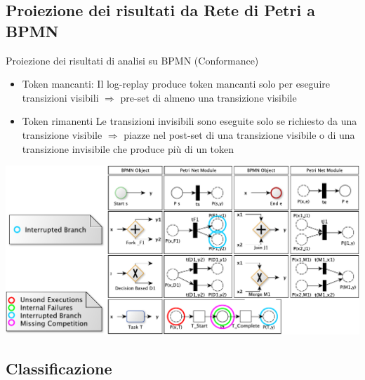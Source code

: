 \documentclass[10pt]{beamer}
\begin{document}
	\subsection{Proiezione dei risultati da Rete di Petri a BPMN}
	\begin{frame}{}
	  \begin{block}{Proiezione dei risultati di analisi su BPMN (Conformance)}
	    \begin{itemize}
	      \item \alert{Token mancanti}: Il log-replay produce token mancanti solo per eseguire transizioni visibili  $\Rightarrow$ pre-set di almeno una transizione visibile
	      \item \alert{Token rimanenti} Le transizioni invisibili sono eseguite solo se richiesto da una transizione visibile $\Rightarrow$ 
	        piazze nel  post-set di una transizione visibile  o di una transizione invisibile che produce pi\`{u} di un token
	
	    \end{itemize}
	  \end{block}
	  
	  \begin{center}
	    \includegraphics[scale=0.40]{./fig/MappingBPMNtoPN2}
	  \end{center}
	
	\end{frame}

	\subsection{Classificazione}
		
	
\end{document}

